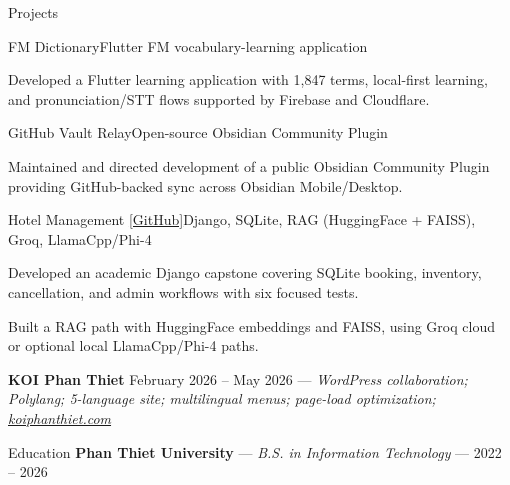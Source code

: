 \documentclass{resume}
\begin{document}
\begin{rSection}{Projects}

\begin{rSubsection}{FM Dictionary}{}{Flutter FM vocabulary-learning application}{}
  \item Developed a Flutter learning application with 1,847 terms, local-first learning, and pronunciation/STT flows supported by Firebase and Cloudflare.
\end{rSubsection}

\begin{rSubsection}{GitHub Vault Relay}{}{Open-source Obsidian Community Plugin}{}
  \item Maintained and directed development of a public Obsidian Community Plugin providing GitHub-backed sync across Obsidian Mobile/Desktop.
\end{rSubsection}

\begin{rSubsection}{Hotel Management \href{https://github.com/ankhang0704/QuanLyKhachSan_AI}{[GitHub]}}{}{Django, SQLite, RAG (HuggingFace + FAISS), Groq, LlamaCpp/Phi-4}{}
  \item Developed an academic Django capstone covering SQLite booking, inventory, cancellation, and admin workflows with six focused tests.
  \item Built a RAG path with HuggingFace embeddings and FAISS, using Groq cloud or optional local LlamaCpp/Phi-4 paths.
\end{rSubsection}

{\footnotesize\textbf{KOI Phan Thiet} \hfill {February 2026 -- May 2026} --- {\em WordPress collaboration; Polylang; 5-language site; multilingual menus; page-load optimization; \href{https://koiphanthiet.com/}{koiphanthiet.com}}}

\end{rSection}

\begin{rSection}{Education}
{\bf Phan Thiet University} --- {\em B.S. in Information Technology} --- {2022 -- 2026}
\end{rSection}
\end{document}
